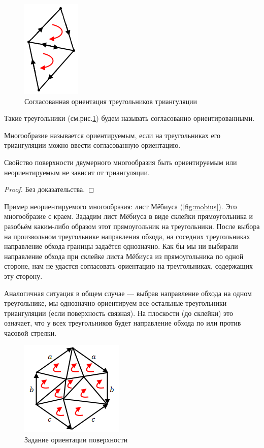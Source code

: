 \begin{figure}[htbp]
    \centering
    \includegraphics[scale=0.7]{images/c11.2.png}
    \caption{Согласованная ориентация треугольников триангуляции}
    \label{fig:c11.2}
\end{figure}

Такие треугольники (см.рис.\ref{fig:c11.2}) будем называть согласованно ориентированными.

\begin{definition}
    Многообразие называется ориентируемым, если на треугольниках его триангуляции можно ввести согласованную ориентацию.
\end{definition} 

\begin{statement}
    Свойство поверхности двумерного многообразия быть ориентируемым или неориентируемым не зависит от триангуляции.
\end{statement} 
\begin{proof}
    Без доказательства.
\end{proof} 

Пример неориентируемого многообразия: лист Мёбиуса (\ref{fig:mobius}). Это многообразие с краем. Зададим лист Мёбиуса в виде склейки прямоугольника и разобьём каким-либо образом этот прямоугольник на треугольники. После выбора на произвольном треугольнике направления обхода, на соседних треугольниках направление обхода границы задаётся однозначно. Как бы мы ни выбирали направление обхода при склейке листа Мёбиуса из прямоугольника по одной стороне, нам не удастся согласовать ориентацию на треугольниках, содержащих эту сторону.

Аналогичная ситуация в общем случае — выбрав направление обхода на одном треугольнике, мы однозначно ориентируем все остальные треугольники триангуляции (если поверхность связная). На плоскости (до склейки) это означает, что у всех треугольников будет направление обхода по или против часовой стрелки.

\begin{figure}[htbp]
    \centering
    \includegraphics[scale=0.7]{images/c11.3.png}
    \caption{Задание ориентации поверхности}
    \label{fig:c11.3}
\end{figure}

